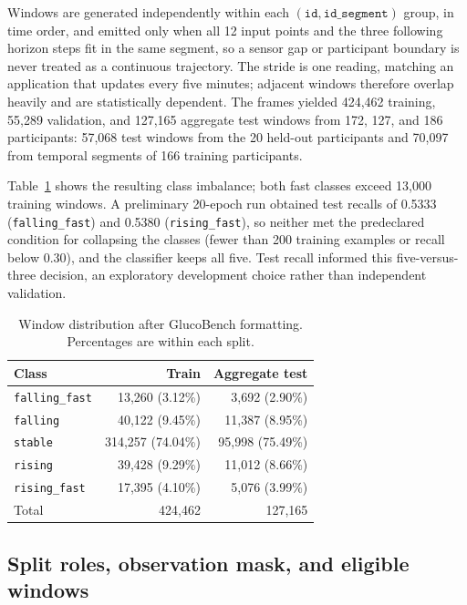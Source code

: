 \documentclass[10pt,twocolumn]{article}
\begin{document}
Windows are generated independently within each $(\texttt{id},
\texttt{id\_segment})$ group, in time order, and emitted only when all 12
input points and the three following horizon steps fit in the same
segment, so a sensor gap or participant boundary is never treated as a
continuous trajectory. The stride is one reading, matching an application
that updates every five minutes; adjacent windows therefore overlap heavily
and are statistically dependent. The frames yielded 424,462 training,
55,289 validation, and 127,165 aggregate test windows from 172, 127, and
186 participants: 57,068 test windows from the 20 held-out participants and
70,097 from temporal segments of 166 training participants.

Table~\ref{tab:distribution} shows the resulting class imbalance; both fast
classes exceed 13,000 training windows. A preliminary 20-epoch run obtained
test recalls of 0.5333 (\texttt{falling\_fast}) and 0.5380
(\texttt{rising\_fast}), so neither met the predeclared condition for
collapsing the classes (fewer than 200 training examples or recall below
0.30), and the classifier keeps all five. Test recall informed this
five-versus-three decision, an exploratory development choice rather than
independent validation.

\begin{table}[t]
\centering
\caption{Window distribution after GlucoBench formatting. Percentages are
within each split.}
\label{tab:distribution}
\small
\begin{tabular}{lrr}
\toprule
Class & Train & Aggregate test \\
\midrule
\texttt{falling\_fast} & 13,260 (3.12\%) & 3,692 (2.90\%) \\
\texttt{falling}       & 40,122 (9.45\%) & 11,387 (8.95\%) \\
\texttt{stable}        & 314,257 (74.04\%) & 95,998 (75.49\%) \\
\texttt{rising}        & 39,428 (9.29\%) & 11,012 (8.66\%) \\
\texttt{rising\_fast} & 17,395 (4.10\%) & 5,076 (3.99\%) \\
\midrule
Total                   & 424,462 & 127,165 \\
\bottomrule
\end{tabular}
\end{table}

\subsection{Split roles, observation mask, and eligible windows}
\label{sec:eligible}
\end{document}
